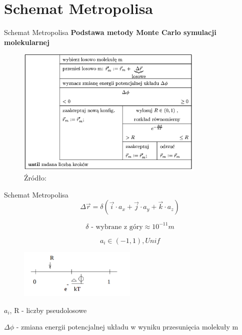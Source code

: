 \section{Schemat Metropolisa}

	\begin{frame}{Schemat Metropolisa}
		\textbf{Podstawa metody Monte Carlo symulacji molekularnej}
		\begin{figure}
			\includegraphics[width=0.8\textwidth]{img/18/metropolis1}
			\caption{Źródło: \cite{metropolis}}
		\end{figure}
	\end{frame}


	\begin{frame}{Schemat Metropolisa}
		$$
			\Delta \vec{r} = \delta(\vec{i} \cdot a_x + \vec{j} \cdot a_y  + \vec{k} \cdot a_z)
		$$		
		
		$$
		\delta \text{ - wybrane z góry} \approx 10^{-11}m
		$$		
		
		$$
		a_i \in (-1, 1), Unif
		$$
		
		\begin{figure}
			\includegraphics[width=0.5\textwidth]{img/18/metropolis2}
		\end{figure}
		$a_i$, R - liczby pseudolosowe
		
		$\Delta\phi$ - zmiana energii potencjalnej układu w wyniku przesunięcia molekuły m
		
	\end{frame}

